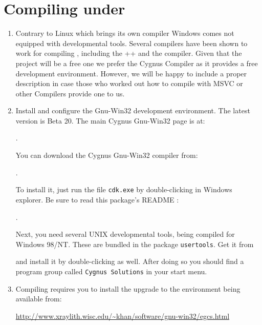 \section{Compiling under }

\begin{enumerate}
\item Contrary to Linux which brings its own compiler Windows comes
not equipped with developmental tools. Several compilers have been shown to work for
compiling {\FlightGear}, including the ++ and the
 compiler. Given that the project will be a free one we prefer the
Cygnus Compiler as it provides a free development environment. However, we will be happy
to include a proper description in case those who worked out how to compile with MSVC or
other Compilers provide one to us.

\item  Install and configure the  Gnu-Win32 development
    environment. The latest version is Beta 20. The main
    Cygnus Gnu-Win32 page is at:

        .

 \noindent
    You can download the Cygnus Gnu-Win32 compiler from:

        .

 \noindent
    To install it, just run the file \texttt{cdk.exe} by double-clicking in
    Windows explorer. Be sure to read this package's README :

        .

 \noindent
    Next, you need several UNIX developmental tools, being compiled for
    Windows 98/NT. These are bundled in the package \texttt{usertools}. Get it
    from


 \noindent
    and install it by double-clicking as well. After doing so you should
    find a program group called \texttt{Cygnus Solutions} in your start menu.

\item  Compiling \FlightGear requires you to install the 
upgrade to the  environment being available from:

\href{http://www.xraylith.wisc.edu/~khan/software/gnu-win32/egcs.html}{http://www.xraylith.wisc.edu/\~{}khan/software/gnu-win32/egcs.html}



\end{enumerate}
